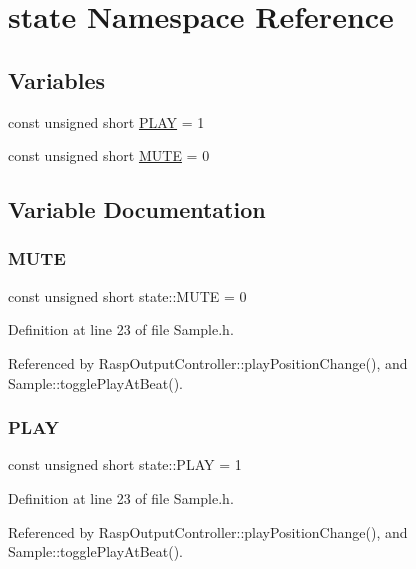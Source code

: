 \hypertarget{namespacestate}{}\section{state Namespace Reference}
\label{namespacestate}
\subsection*{Variables}
\begin{DoxyCompactItemize}
\item 
const unsigned short \hyperlink{namespacestate_afea5348759175ad498402b0148f8b6b2}{P\+L\+AY} = 1
\item 
const unsigned short \hyperlink{namespacestate_a925633150a5fb17786e9c8d9aaa69c9d}{M\+U\+TE} = 0
\end{DoxyCompactItemize}


\subsection{Variable Documentation}
\mbox{\label{namespacestate_a925633150a5fb17786e9c8d9aaa69c9d}} 
\subsubsection{\texorpdfstring{M\+U\+TE}{MUTE}}
{\footnotesize\ttfamily const unsigned short state\+::\+M\+U\+TE = 0}



Definition at line 23 of file Sample.\+h.



Referenced by Rasp\+Output\+Controller\+::play\+Position\+Change(), and Sample\+::toggle\+Play\+At\+Beat().

\mbox{\label{namespacestate_afea5348759175ad498402b0148f8b6b2}} 
\subsubsection{\texorpdfstring{P\+L\+AY}{PLAY}}
{\footnotesize\ttfamily const unsigned short state\+::\+P\+L\+AY = 1}



Definition at line 23 of file Sample.\+h.



Referenced by Rasp\+Output\+Controller\+::play\+Position\+Change(), and Sample\+::toggle\+Play\+At\+Beat().

